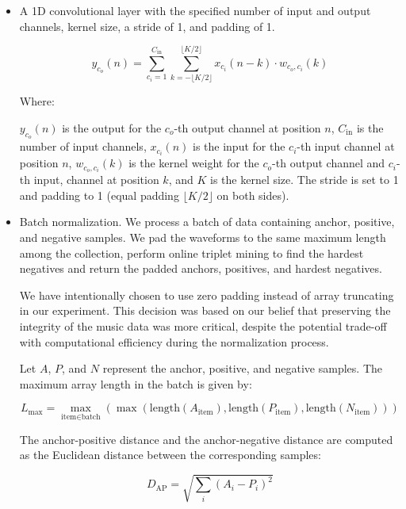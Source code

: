 \begin{itemize}
    \item A 1D convolutional layer with the specified number of input and output channels, kernel size, a stride of 1, and padding of 1.

    \begin{equation}
y_{c_o}(n) = \sum_{c_i=1}^{C_{\text{in}}} \sum_{k=-\lfloor K/2 \rfloor}^{\lfloor K/2 \rfloor} x_{c_i}(n - k) \cdot w_{c_o, c_i}(k)
\end{equation}

Where:

$y_{c_o}(n)$ is the output for the $c_o$-th output channel at position $n$, $C_{\text{in}}$ is the number of input channels, $x_{c_i}(n)$ is the input for the $c_i$-th input channel at position $n$, $w_{c_o, c_i}(k)$ is the kernel weight for the $c_o$-th output channel and $c_i$-th input, channel at position $k$, and $K$ is the kernel size. The stride is set to 1 and padding to 1 (equal padding $\lfloor K/2 \rfloor$ on both sides).

\item Batch normalization. We process a batch of data containing anchor, positive, and negative samples. We pad the waveforms to the same  maximum length among the collection, perform online triplet mining to find the hardest negatives and return the padded anchors, positives, and hardest negatives.

We have intentionally chosen to use zero padding instead of array truncating in our experiment. This decision was based on our belief that preserving the integrity of the music data was more critical, despite the potential trade-off with computational efficiency during the normalization process.

Let $A$, $P$, and $N$ represent the anchor, positive, and negative samples. The maximum array length in the batch is given by:

\begin{equation}
L_{\text{max}} = \max_{\text{item} \in \text{batch}}(\max(\text{length}(A_{\text{item}}), \text{length}(P_{\text{item}}), \text{length}(N_{\text{item}})))
\end{equation}

The anchor-positive distance and the anchor-negative distance are computed as the Euclidean distance between the corresponding samples:

\begin{equation}
D_{\text{AP}} = \sqrt{\sum_{i} (A_i - P_i)^2}
\end{equation}


\end{itemize}
